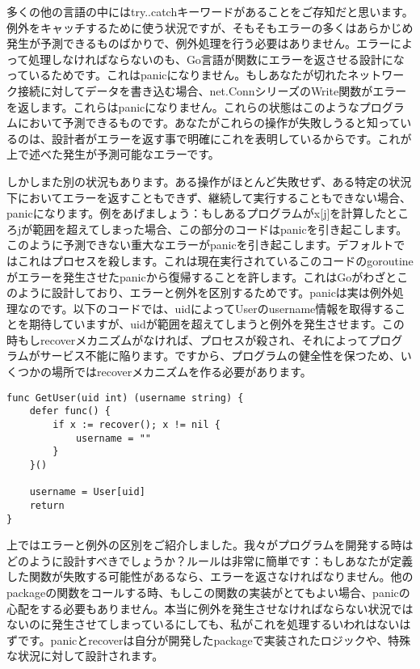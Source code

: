 多くの他の言語の中にはtry..catchキーワードがあることをご存知だと思います。例外をキャッチするために使う状況ですが、そもそもエラーの多くはあらかじめ発生が予測できるものばかりで、例外処理を行う必要はありません。エラーによって処理しなければならないのも、Go言語が関数にエラーを返させる設計になっているためです。これはpanicになりません。もしあなたが切れたネットワーク接続に対してデータを書き込む場合、net.ConnシリーズのWrite関数がエラーを返します。これらはpanicになりません。これらの状態はこのようなプログラムにおいて予測できるものです。あなたがこれらの操作が失敗しうると知っているのは、設計者がエラーを返す事で明確にこれを表明しているからです。これが上で述べた発生が予測可能なエラーです。

しかしまた別の状況もあります。ある操作がほとんど失敗せず、ある特定の状況下においてエラーを返すこともできず、継続して実行することもできない場合、panicになります。例をあげましょう：もしあるプログラムがx[j]を計算したところjが範囲を超えてしまった場合、この部分のコードはpanicを引き起こします。このように予測できない重大なエラーがpanicを引き起こします。デフォルトではこれはプロセスを殺します。これは現在実行されているこのコードのgoroutineがエラーを発生させたpanicから復帰することを許します。これはGoがわざとこのように設計しており、エラーと例外を区別するためです。panicは実は例外処理なのです。以下のコードでは、uidによってUserのusername情報を取得することを期待していますが、uidが範囲を超えてしまうと例外を発生させます。この時もしrecoverメカニズムがなければ、プロセスが殺され、それによってプログラムがサービス不能に陥ります。ですから、プログラムの健全性を保つため、いくつかの場所ではrecoverメカニズムを作る必要があります。

\begin{lstlisting}[numbers=none]
func GetUser(uid int) (username string) {
    defer func() {
        if x := recover(); x != nil {
            username = ""
        }
    }()

    username = User[uid]
    return
}
\end{lstlisting}

上ではエラーと例外の区別をご紹介しました。我々がプログラムを開発する時はどのように設計すべきでしょうか？ルールは非常に簡単です：もしあなたが定義した関数が失敗する可能性があるなら、エラーを返さなければなりません。他のpackageの関数をコールする時、もしこの関数の実装がとてもよい場合、panicの心配をする必要もありません。本当に例外を発生させなければならない状況ではないのに発生させてしまっているにしても、私がこれを処理するいわれはないはずです。panicとrecoverは自分が開発したpackageで実装されたロジックや、特殊な状況に対して設計されます。

